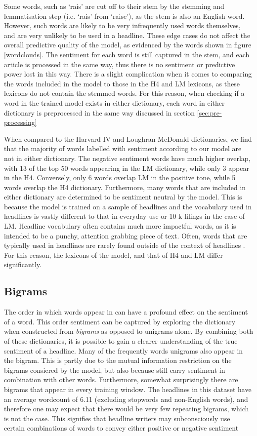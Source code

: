 Some words, such as `rais' are cut off to their stem by the stemming and lemmatisation step (i.e. `rais' from `raise'), as the stem is also an English word. However, such words are likely to be very infrequently used words themselves, and are very unlikely to be used in a headline. These edge cases do not affect the overall predictive quality of the model, as evidenced by the words shown in figure \ref{wordclouds}. The sentiment for each word is still captured in the stem, and each article is processed in the same way, thus there is no sentiment or predictive power lost in this way. There is a slight complication when it comes to comparing the words included in the model to those in the H4 and LM lexicons, as these lexicons do not contain the stemmed words. For this reason, when checking if a word in the trained model exists in either dictionary, each word in either dictionary is preprocessed in the same way discussed in section \ref{sec:pre-processing}

When compared to the Harvard IV and Loughran McDonald dictionaries, we find that the majority of words labelled with sentiment according to our model are not in either dictionary. The negative sentiment words have much higher overlap, with 13 of the top 50 words appearing in the LM dictionary, while only 3 appear in the H4. Conversely, only 6 words overlap LM in the positive tone, while 5 words overlap the H4 dictionary. Furthermore, many words that are included in either dictionary are determined to be sentiment neutral by the model. This is because the model is trained on a sample of headlines and the vocabulary used in headlines is vastly different to that in everyday use or 10-k filings in the case of LM. Headline vocabulary often contains much more impactful words, as it is intended to be a punchy, attention grabbing piece of text. Often, words that are typically used in headlines are rarely found outside of the context of headlines \parencite{language-newspapers}. For this reason, the lexicons of the model, and that of H4 and LM differ significantly.

\subsection{Bigrams}
The order in which words appear in can have a profound effect on the sentiment of a word. This order sentiment can be captured by exploring the dictionary when constructed from \textit{bigrams} as opposed to unigrams alone. By combining both of these dictionaries, it is possible to gain a clearer understanding of the true sentiment of a headline. Many of the frequently  words unigrams also appear in the bigram. This is partly due to the mutual information restriction on the bigrams consiered by the model, but also because still carry sentiment in combination with other words. Furthermore, somewhat surprisingly there are bigrams that appear in every training window. The headlines in this dataset have an average wordcount of 6.11 (excluding stopwords and non-English words), and therefore one may expect that there would be very few repeating bigrams, which is not the case. This signifies that headline writers may subconsciously use certain combinations of words to convey either positive or negative sentiment

